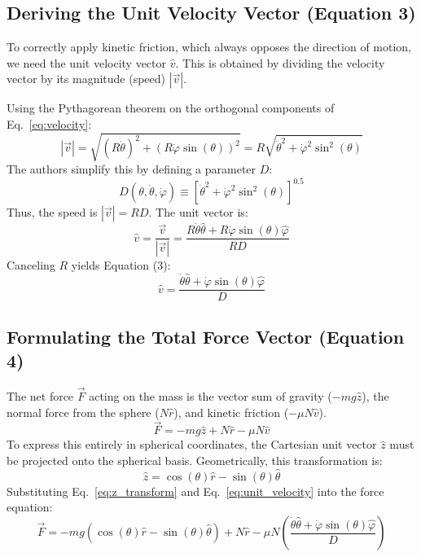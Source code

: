 \documentclass[11pt,letterpaper]{article}
\begin{document}
\subsection{Deriving the Unit Velocity Vector (Equation 3)}
To correctly apply kinetic friction, which always opposes the direction of motion, we need the unit velocity vector $\hat{v}$. This is obtained by dividing the velocity vector by its magnitude (speed) $|\vec{v}|$.

Using the Pythagorean theorem on the orthogonal components of Eq.~\eqref{eq:velocity}:
\begin{equation}
|\vec{v}| = \sqrt{(R\dot{\theta})^2 + (R\dot{\varphi}\sin(\theta))^2} = R\sqrt{\dot{\theta}^2 + \dot{\varphi}^2\sin^2(\theta)}
\end{equation}
The authors simplify this by defining a parameter $D$:
\begin{equation}
D(\theta,\dot{\theta},\dot{\varphi}) \equiv [\dot{\theta}^2 + \dot{\varphi}^2\sin^2(\theta)]^{0.5}
\end{equation}
Thus, the speed is $|\vec{v}| = RD$. The unit vector is:
\begin{equation}
\hat{v} = \frac{\vec{v}}{|\vec{v}|} = \frac{R\dot{\theta}\hat{\theta} + R\dot{\varphi}\sin(\theta)\hat{\varphi}}{RD}
\end{equation}
Canceling $R$ yields Equation (3):
\begin{equation}\label{eq:unit_velocity}
\hat{v} = \frac{\dot{\theta}\hat{\theta} + \dot{\varphi}\sin(\theta)\hat{\varphi}}{D}
\end{equation}

\subsection{Formulating the Total Force Vector (Equation 4)}
The net force $\vec{F}$ acting on the mass is the vector sum of gravity ($-mg\hat{z}$), the normal force from the sphere ($N\hat{r}$), and kinetic friction ($-\mu N\hat{v}$).
\begin{equation}
\vec{F} = -mg\hat{z} + N\hat{r} - \mu N\hat{v}
\end{equation}
To express this entirely in spherical coordinates, the Cartesian unit vector $\hat{z}$ must be projected onto the spherical basis. Geometrically, this transformation is:
\begin{equation}\label{eq:z_transform}
\hat{z} = \cos(\theta)\hat{r} - \sin(\theta)\hat{\theta}
\end{equation}
Substituting Eq.~\eqref{eq:z_transform} and Eq.~\eqref{eq:unit_velocity} into the force equation:
\begin{equation}
\vec{F} = -mg(\cos(\theta)\hat{r} - \sin(\theta)\hat{\theta}) + N\hat{r} - \mu N\left(\frac{\dot{\theta}\hat{\theta} + \dot{\varphi}\sin(\theta)\hat{\varphi}}{D}\right)
\end{equation}
\end{document}
